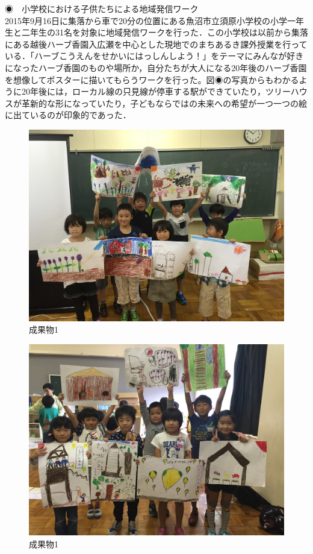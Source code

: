 \documentclass[a4paper]{jsarticle}
\begin{document}
\begin{itemize}
\subsubsubsection ◉　小学校における子供たちによる地域発信ワーク\\
2015年9月16日に集落から車で20分の位置にある魚沼市立須原小学校の小学一年生と二年生の31名を対象に地域発信ワークを行った．この小学校は以前から集落にある越後ハーブ香園入広瀬を中心とした現地でのまちあるき課外授業を行っている．「ハーブこうえんをせかいにはっしんしよう！」をテーマにみんなが好きになったハーブ香園のものや場所か，自分たちが大人になる20年後のハーブ香園を想像してポスターに描いてもらうワークを行った。図◉の写真からもわかるように20年後には，ローカル線の只見線が停車する駅ができていたり，ツリーハウスが革新的な形になっていたり，子どもならではの未来への希望が一つ一つの絵に出ているのが印象的であった．

\begin{figure}[H]
  \begin{center}
    \includegraphics[width=1.0\hsize]{./images/IMG_3723.JPG}
    \caption{成果物1}
    \label{fig:tmu_hino}
  \end{center}
\end{figure}
\begin{figure}[H]
  \begin{center}
    \includegraphics[width=1.0\hsize]{./images/07.jpg}
    \caption{成果物1}
    \label{fig:tmu_hino}
  \end{center}
\end{figure}



\end{itemize}
\end{document}
